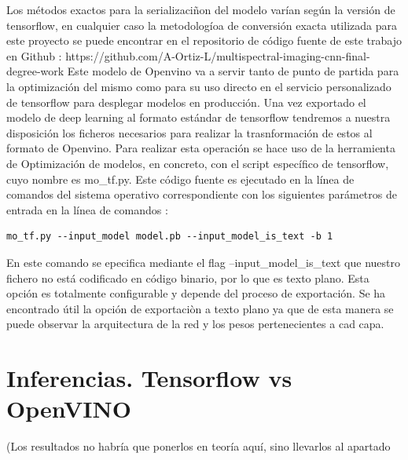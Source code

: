 Los métodos exactos para la serializaciñon del modelo varían según la versión de tensorflow, en cualquier caso la metodologíoa de conversión exacta utilizada
para este proyecto se puede encontrar en el repositorio de código fuente de este trabajo en Github : https://github.com/A-Ortiz-L/multispectral-imaging-cnn-final-degree-work
Este modelo de Openvino va a servir tanto de punto de partida para la optimización del mismo como para su uso directo en el servicio personalizado de tensorflow para desplegar
modelos en producción.
Una vez exportado el modelo de deep learning al formato estándar de tensorflow tendremos a nuestra disposición los ficheros necesarios para realizar la trasnformación de estos al formato de Openvino.
Para realizar esta operación se hace uso de la herramienta de Optimización de modelos, en concreto, con el script específico de tensorflow, cuyo nombre
es mo_tf.py.
Este código fuente es ejecutado en la línea de comandos del sistema operativo correspondiente con los siguientes parámetros de entrada en la línea de comandos :
\begin{lstlisting}
mo_tf.py --input_model model.pb --input_model_is_text -b 1
\end{lstlisting}
En este comando se epecifica mediante el flag --input_model_is_text que nuestro fichero no está codificado en código binario, por lo que es texto plano.
Esta opción es totalmente configurable y depende del proceso de exportación.
Se ha encontrado útil la opción de exportaciòn a texto plano ya que de esta manera
se puede observar la arquitectura de la red y los pesos pertenecientes a cad capa.



\section{Inferencias.
Tensorflow vs OpenVINO}\label{sec:inferencias.-tensorflow-vs-openvino}
(Los resultados no habría que ponerlos en teoría aquí, sino llevarlos al apartado